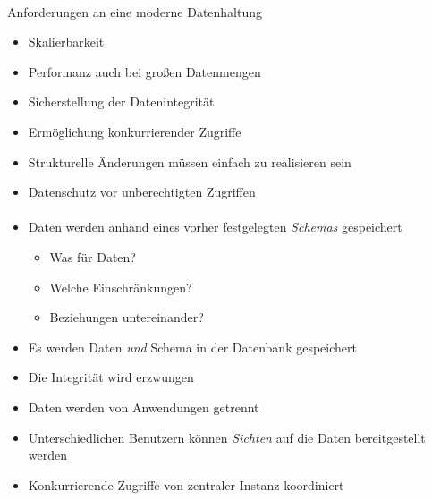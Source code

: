 \begin{frame}[t]{\insertsection}
\framesubtitle{\insertsubsection}
\begin{block}{Anforderungen an eine moderne Datenhaltung}
	\begin{itemize}
		\item Skalierbarkeit
		\item Performanz auch bei großen Datenmengen
		\item Sicherstellung der Datenintegrität
		\item Ermöglichung konkurrierender Zugriffe
		\item Strukturelle Änderungen müssen einfach zu realisieren sein
		\item Datenschutz vor unberechtigten Zugriffen
	\end{itemize}
\end{block}
\end{frame}

\begin{frame}{\insertsection}
	\framesubtitle{\insertsubsection}
	\begin{itemize}
		\item Daten werden anhand eines vorher festgelegten \textit{Schemas} gespeichert
		\begin{itemize}
			\item Was für Daten?
			\item Welche Einschränkungen?
			\item Beziehungen untereinander?
		\end{itemize}
		\item Es werden Daten \textit{und} Schema in der Datenbank gespeichert
		\item Die Integrität wird erzwungen
		\item Daten werden von Anwendungen getrennt
		\item Unterschiedlichen Benutzern können \textit{Sichten} auf die Daten bereitgestellt werden
		\item Konkurrierende Zugriffe von zentraler Instanz koordiniert
	\end{itemize}
\end{frame}

